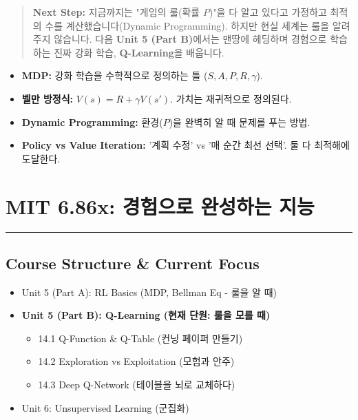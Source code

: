 \documentclass[11pt,a4paper]{book}
\theoremstyle{definition}
\begin{document}
\vspace{1cm}
\begin{quote}
\textbf{Next Step:} 지금까지는 "게임의 룰(확률 $P$)"을 다 알고 있다고 가정하고 최적의 수를 계산했습니다(Dynamic Programming). 하지만 현실 세계는 룰을 알려주지 않습니다. 다음 \textbf{Unit 5 (Part B)}에서는 맨땅에 헤딩하며 경험으로 학습하는 진짜 강화 학습, \textbf{Q-Learning}을 배웁니다.
\end{quote}

\begin{summarybox}[title={Unit 5 (Part A) 핵심 요약}]
\begin{itemize}
    \item \textbf{MDP:} 강화 학습을 수학적으로 정의하는 틀 ($S, A, P, R, \gamma$).
    \item \textbf{벨만 방정식:} $V(s) = R + \gamma V(s')$. 가치는 재귀적으로 정의된다.
    \item \textbf{Dynamic Programming:} 환경($P$)을 완벽히 알 때 문제를 푸는 방법.
    \item \textbf{Policy vs Value Iteration:} '계획 수정' vs '매 순간 최선 선택'. 둘 다 최적해에 도달한다.
\end{itemize}
\end{summarybox}


\chapter{MIT 6.86x: 경험으로 완성하는 지능}
\label{ch:lecture14}


\vspace{1cm}
\hrule
\vspace{1cm}

\section*{Course Structure \& Current Focus}
\begin{itemize}
    \item Unit 5 (Part A): RL Basics (MDP, Bellman Eq - 룰을 알 때)
    \item \textbf{\textcolor{mainblue}{Unit 5 (Part B): Q-Learning (현재 단원: 룰을 모를 때)}}
    \begin{itemize}
        \item 14.1 Q-Function \& Q-Table (컨닝 페이퍼 만들기)
        \item 14.2 Exploration vs Exploitation (모험과 안주)
        \item 14.3 Deep Q-Network (테이블을 뇌로 교체하다)
    \end{itemize}
    \item Unit 6: Unsupervised Learning (군집화)
\end{itemize}
\end{document}
